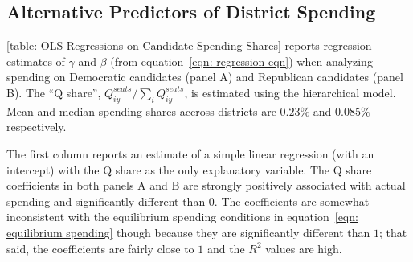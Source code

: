 \documentclass[12pt,final,fleqn]{article}
\theoremstyle{plain}
\begin{document}
\subsection{Alternative Predictors of District Spending}
\autoref{table: OLS Regressions on Candidate Spending Shares} reports regression estimates of $\gamma$ and $\beta$ (from equation~\ref{eqn: regression eqn}) when analyzing spending on Democratic candidates (panel A) and Republican candidates (panel B). The ``Q share'', $Q_{iy}^{seats}/ \sum_i Q_{iy}^{seats}$, is estimated using the hierarchical model. Mean and median spending shares accross districts are $0.23\%$ and $0.085\%$ respectively. 

The first column reports an estimate of a simple linear regression (with an intercept) with the Q share as the only explanatory variable. The Q share coefficients in both panels A and B are strongly positively associated with actual spending and significantly different than $0$. The coefficients are somewhat inconsistent with the equilibrium spending conditions in equation~\ref{eqn: equilibrium spending} though because they are significantly different than $1$; that said, the coefficients are fairly close to $1$ and the $R^2$ values are high.
\end{document}
